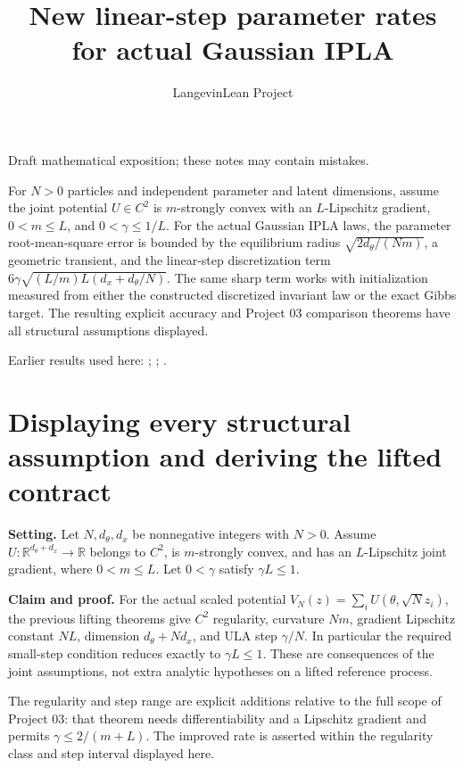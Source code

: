 \documentclass[11pt,a4paper]{article}
\title{\texorpdfstring{New linear-step parameter rates for actual Gaussian IPLA}{New linear-step parameter rates for actual Gaussian IPLA}}
\author{LangevinLean Project}
\date{}
\begin{document}
\maketitle
Draft mathematical exposition; these notes may contain mistakes.


For \(N>0\) particles and independent parameter and latent dimensions, assume the joint potential \(U\in C^2\) is \(m\)-strongly convex with an \(L\)-Lipschitz gradient, \(0<m\le L\), and \(0<\gamma\le1/L\). For the actual Gaussian IPLA laws, the parameter root-mean-square error is bounded by the equilibrium radius \(\sqrt{2d_\theta/(Nm)}\), a geometric transient, and the linear-step discretization term \(6\gamma\sqrt{(L/m)L(d_x+d_\theta/N)}\). The same sharp term works with initialization measured from either the constructed discretized invariant law or the exact Gibbs target. The resulting explicit accuracy and Project 03 comparison theorems have all structural assumptions displayed.



Earlier results used here: \cite[Section~3.13]{LangevinLean2026IPLA}; \cite[Section~3.4]{LangevinLean2026IPLA}; \cite[Section~3.5]{LangevinLean2026IPLA}.

\section{\texorpdfstring{Displaying every structural assumption and deriving the lifted contract}{Displaying every structural assumption and deriving the lifted contract}}


\textbf{Setting.} Let \(N,d_\theta,d_x\) be nonnegative integers with \(N>0\). Assume \(U:\mathbb R^{d_\theta+d_x}\to\mathbb R\) belongs to \(C^2\), is \(m\)-strongly convex, and has an \(L\)-Lipschitz joint gradient, where \(0<m\le L\). Let \(0<\gamma\) satisfy \(\gamma L\le1\).




\textbf{Claim and proof.} For the actual scaled potential \(V_N(z)=\sum_iU(\theta,\sqrt N z_i)\), the previous lifting theorems give \(C^2\) regularity, curvature \(Nm\), gradient Lipschitz constant \(NL\), dimension \(d_\theta+Nd_x\), and ULA step \(\gamma/N\). In particular the required small-step condition reduces exactly to \(\gamma L\le1\). These are consequences of the joint assumptions, not extra analytic hypotheses on a lifted reference process.




The regularity and step range are explicit additions relative to the full scope of Project 03: that theorem needs differentiability and a Lipschitz gradient and permits \(\gamma\le2/(m+L)\). The improved rate is asserted within the regularity class and step interval displayed here.
\end{document}
